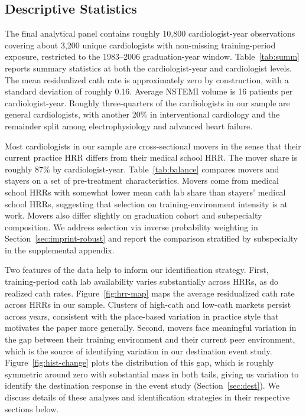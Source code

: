 \documentclass[12pt]{article}
\begin{document}
\subsection{Descriptive Statistics}\label{sec:desc}

The final analytical panel contains roughly 10{,}800 cardiologist-year observations covering about 3{,}200 unique cardiologists with non-missing training-period exposure, restricted to the 1983--2006 graduation-year window. Table~\ref{tab:summ} reports summary statistics at both the cardiologist-year and cardiologist levels. The mean residualized cath rate is approximately zero by construction, with a standard deviation of roughly 0.16. Average NSTEMI volume is 16 patients per cardiologist-year. Roughly three-quarters of the cardiologists in our sample are general cardiologists, with another 20\% in interventional cardiology and the remainder split among electrophysiology and advanced heart failure.

Most cardiologists in our sample are cross-sectional movers in the sense that their current practice HRR differs from their medical school HRR. The mover share is roughly 87\% by cardiologist-year. Table~\ref{tab:balance} compares movers and stayers on a set of pre-treatment characteristics. Movers come from medical school HRRs with somewhat lower mean cath lab share than stayers' medical school HRRs, suggesting that selection on training-environment intensity is at work. Movers also differ slightly on graduation cohort and subspecialty composition. We address selection via inverse probability weighting in Section~\ref{sec:imprint-robust} and report the comparison stratified by subspecialty in the supplemental appendix.

Two features of the data help to inform our identification strategy. First, training-period cath lab availability varies substantially across HRRs, as do realized cath rates. Figure~\ref{fig:hrr-map} maps the average residualized cath rate across HRRs in our sample. Clusters of high-cath and low-cath markets persist across years, consistent with the place-based variation in practice style that motivates the paper more generally. Second, movers face meaningful variation in the gap between their training environment and their current peer environment, which is the source of identifying variation in our destination event study. Figure~\ref{fig:hist-change} plots the distribution of this gap, which is roughly symmetric around zero with substantial mass in both tails, giving us variation to identify the destination response in the event study (Section~\ref{sec:dest}). We discuss details of these analyses and identification strategies in their respective sections below.
\end{document}
